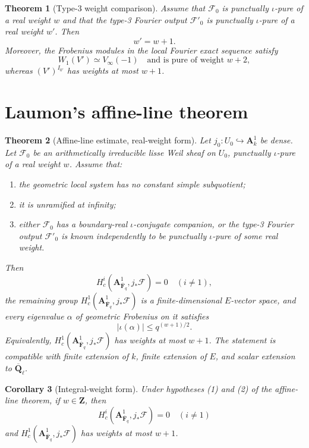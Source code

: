 \documentclass[10pt]{article}
\newtheorem{theorem}{Theorem}[section]
\newtheorem{corollary}[theorem]{Corollary}
\theoremstyle{definition}
\newcommand{\Fbar}{\overline{\mathbf F}_q}
\newcommand{\Qlb}{\overline{\mathbf Q}_\ell}
\newcommand{\Aone}{\mathbf A^1}
\begin{document}
\begin{theorem}[Type-3 weight comparison]
Assume that \(\mathcal F_0\) is punctually \(\iota\)-pure of a real weight
\(w\) and that the type-3 Fourier output \(\mathcal F'_0\) is punctually
\(\iota\)-pure of a real weight \(w'\).  Then
\[
                              w'=w+1.
\]
Moreover, the Frobenius modules in the local Fourier exact sequence satisfy
\[
 W_1(V')\simeq V_\infty(-1)\quad\text{and is pure of weight }w+2,
\]
whereas \((V')^{I_{0'}}\) has weights at most \(w+1\).
\end{theorem}

\section{Laumon's affine-line theorem}

\begin{theorem}[Affine-line estimate, real-weight form]
Let \(j_0:U_0\hookrightarrow\Aone_k\) be dense.  Let \(\mathcal F_0\) be an
arithmetically irreducible lisse Weil sheaf on \(U_0\), punctually
\(\iota\)-pure of a real weight \(w\).  Assume that:
\begin{enumerate}
\item the geometric local system has no constant simple subquotient;
\item it is unramified at infinity;
\item either \(\mathcal F_0\) has a boundary-real \(\iota\)-conjugate
companion, or the type-3 Fourier output \(\mathcal F'_0\) is known
independently to be punctually \(\iota\)-pure of some real weight.
\end{enumerate}
Then
\[
 H_c^i(\Aone_{\Fbar},j_*\mathcal F)=0\quad(i\ne1),
\]
the remaining group \(H_c^1(\Aone_{\Fbar},j_*\mathcal F)\) is a
finite-dimensional \(E\)-vector space, and every eigenvalue \(\alpha\) of
geometric Frobenius on it satisfies
\[
       |\iota(\alpha)|\le q^{(w+1)/2}.
\]
Equivalently, \(H_c^1(\Aone_{\Fbar},j_*\mathcal F)\) has weights at most
\(w+1\).  The statement is compatible with finite extension of \(k\),
finite extension of \(E\), and scalar extension to \(\Qlb\).
\end{theorem}

\begin{corollary}[Integral-weight form]
Under hypotheses (1) and (2) of the affine-line theorem, if
\(w\in\mathbf Z\), then
\[
 H_c^i(\Aone_{\Fbar},j_*\mathcal F)=0\quad(i\ne1)
\]
and \(H_c^1(\Aone_{\Fbar},j_*\mathcal F)\) has weights at most \(w+1\).
\end{corollary}
\end{document}
